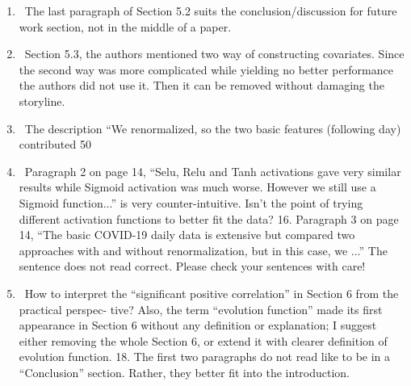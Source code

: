 \documentclass[12pt]{article}
\theoremstyle{definition}
\renewcommand{\_}{%
    \textunderscore\hspace{0pt}%
}
\newcommand{\DOIT}{{\color{red!60!black}\makebox[0pt][l]{$\square$}\raisebox{.15ex}{\hspace{0.1em}$\boxtimes}}~}
\begin{document}
\begin{enumerate}
    \begin{quote}
    \end{quote}

\item \DOIT The last paragraph of Section 5.2 suits the conclusion/discussion for future work section, not in the middle of a paper.

    \begin{quote}
    \end{quote}

\item \DOIT Section 5.3, the authors mentioned two way of constructing covariates. Since the second way was more complicated while yielding no better performance the authors did not use it. Then it can be removed without damaging the storyline.

    \begin{quote}
    \end{quote}

\item \DOIT The description “We renormalized, so the two basic features (following day) contributed 50%

    \begin{quote}
    \end{quote}

\item \DOIT Paragraph 2 on page 14, “Selu, Relu and Tanh activations gave very similar results while Sigmoid activation was much worse. However we still use a Sigmoid function...” is very counter-intuitive. Isn’t the point of trying different activation functions to better fit the data?
16. Paragraph 3 on page 14, “The basic COVID-19 daily data is extensive but compared two approaches with and without renormalization, but in this case, we ...” The sentence does not read correct. Please check your sentences with care!

    \begin{quote}
    \end{quote}

\item \DOIT How to interpret the “significant positive correlation” in Section 6 from the practical perspec- tive? Also, the term “evolution function” made its first appearance in Section 6 without any definition or explanation; I suggest either removing the whole Section 6, or extend it with clearer definition of evolution function.
18. The first two paragraphs do not read like to be in a “Conclusion” section. Rather, they better fit into the introduction.
    
    \begin{quote}
    \end{quote}

\end{enumerate}
\end{document}
